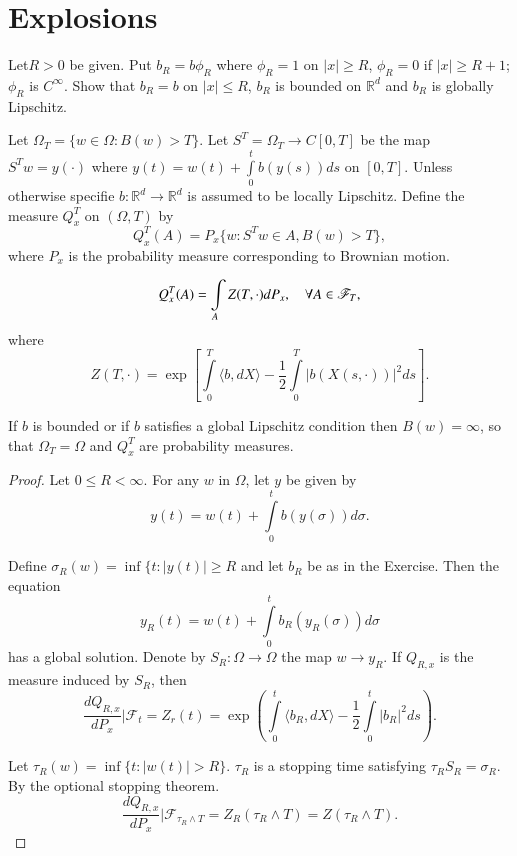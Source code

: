 \chapter{Explosions}\label{chap24}

\begin{exer*}
Let\pageoriginale $R>0$ be given. Put $b_{R}=b\phi_{R}$ where
$\phi_{R}=1$ on $|x|\geq R$, $\phi_{R}=0$ if $|x|\geq R+1$; $\phi_{R}$
is $C^{\infty}$. Show that $b_{R}=b$ on $|x|\leq R$, $b_{R}$ is
bounded on $\mathbb{R}^{d}$ and $b_{R}$ is globally Lipschitz.
\end{exer*}

Let $\Omega_{T}=\{w\in \Omega :B(w)>T\}$. Let $S^{T}=\Omega_{T}\to
C[0,T]$ be the map $S^{T}w=y(\cdot)$ where
$y(t)=w(t)+\int\limits^{t}_{0}b(y(s))ds$ on $[0,T]$. Unless otherwise
specifie $b:\mathbb{R}^{d}\to \mathbb{R}^{d}$ is assumed to be locally
Lipschitz. Define the measure $Q^{T}_{x}$ on $(\Omega,T)$ by
$$
Q^{T}_{x}(A)=P_{x}\{w:S^{T}w\in A,B(w)>T\},
$$
where $P_{x}$ is the probability measure corresponding to Brownian motion.

\begin{theorem*}
$$
Q^{T}_{x}(A)=\int\limits_{A}Z(T,\cdot)dP_{x},\quad \forall A\in
\mathscr{F}_{T}, 
$$
where
$$
Z(T,\cdot)=\exp\left[\int\limits^{T}_{0}\langle b,dX\rangle
  -\frac{1}{2}\int\limits^{T}_{0}|b(X(s,\cdot))|^{2}ds\right].
$$
\end{theorem*}

\begin{remark*}
If $b$ is bounded or if $b$ satisfies a global Lipschitz condition
then $B(w)=\infty$, so that $\Omega_{T}=\Omega$ and $Q^{T}_{x}$ are
probability measures.
\end{remark*}

\begin{proof}
Let $0\leq R<\infty$. For any $w$ in $\Omega$, let $y$ be given by
$$
y(t)=w(t)+\int\limits^{t}_{0}b(y(\sigma))d\sigma.
$$

Define $\sigma_{R}(w)=\inf\{t:|y(t)|\geq R$ and let $b_{R}$ be as in
the Exercise. Then the equation
$$
y_{R}(t)=w(t)+\int\limits^{t}_{0}b_{R}(y_{R}(\sigma))d\sigma
$$\pageoriginale
has a global solution. Denote by $S_{R}:\Omega\to \Omega$ the map
$w\to y_{R}$. If $Q_{R,x}$ is the measure induced by $S_{R}$, then
$$
\frac{dQ_{R,x}}{dP_{x}}\Big|\mathscr{F}_{t}=Z_{r}(t)=\exp
\left(\int\limits^{t}_{0}\langle b_{R},dX\rangle
-\frac{1}{2}\int\limits^{t}_{0}|b_{R}|^{2}ds\right). 
$$

Let $\tau_{R}(w)=\inf\{t:|w(t)|>R\}$. $\tau_{R}$ is a stopping time
satisfying $\tau_{R}S_{R}=\sigma_{R}$. By the optional stopping
theorem.
\begin{equation*}
\frac{dQ_{R,x}}{dP_{x}}\Big|\mathscr{F}_{\tau_{R}\wedge
  T}=Z_{R}(\tau_{R}\wedge T)=Z(\tau_{R}\wedge T).\tag{1}
\end{equation*}
\end{proof}

